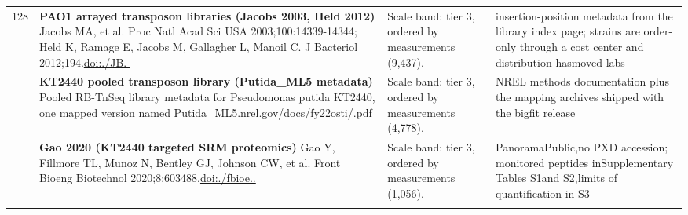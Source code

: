 \begin{landscape}
\begin{longtable}{@{}r@{\hspace{4pt}} L{78mm} L{72mm} L{76mm}@{}}
128 & \textbf{PAO1 arrayed transposon libraries (Jacobs 2003, Held 2012)} \newline Jacobs MA, et al. Proc Natl Acad Sci USA 2003;100:14339-14344; Held K, Ramage E, Jacobs M, Gallagher L, Manoil C. J Bacteriol 2012;194.\newline \href{https://doi.org/10.1128/JB.01479-12}{doi:./\allowbreak JB.-} & Scale band: tier 3, ordered by measurements (9,437). & insertio\allowbreak n-\allowbreak positio\allowbreak n metada\allowbreak ta from \allowbreak the libr\allowbreak ary inde\allowbreak x page; \allowbreak strains \allowbreak are orde\allowbreak r-\allowbreak only th\allowbreak rough a \allowbreak cost cen\allowbreak ter and \allowbreak distribu\allowbreak tion has\allowbreak  moved l\allowbreak abs \\
 & \textbf{KT2440 pooled transposon library (Putida\_ML5 metadata)} \newline Pooled RB-TnSeq library metadata for Pseudomonas putida KT2440, one mapped version named Putida\_ML5.\newline \href{https://nrel.gov/docs/fy22osti/83183.pdf}{nrel.\allowbreak gov/\allowbreak docs/\allowbreak fy22ost\allowbreak i/.\allowbreak pdf} & Scale band: tier 3, ordered by measurements (4,778). & NREL met\allowbreak hods doc\allowbreak umentati\allowbreak on plus \allowbreak the mapp\allowbreak ing arch\allowbreak ives shi\allowbreak pped wit\allowbreak h the bi\allowbreak gfit rel\allowbreak ease \\
 & \textbf{Gao 2020 (KT2440 targeted SRM proteomics)} \newline Gao Y, Fillmore TL, Munoz N, Bentley GJ, Johnson CW, et al. Front Bioeng Biotechnol 2020;8:603488.\newline \href{https://doi.org/10.3389/fbioe.2020.603488}{doi:./\allowbreak fbioe..} & Scale band: tier 3, ordered by measurements (1,056). & Panorama\allowbreak  Public,\allowbreak  no PXD \allowbreak accessio\allowbreak n; monit\allowbreak ored pep\allowbreak tides in\allowbreak  Supplem\allowbreak entary T\allowbreak ables S1\allowbreak  and S2,\allowbreak  limits \allowbreak of quant\allowbreak ificatio\allowbreak n in S3 \\
\addlinespace[5pt]

\end{longtable}
\end{landscape}
